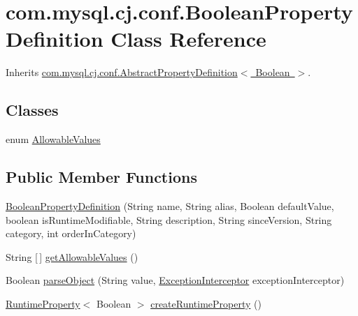 \hypertarget{classcom_1_1mysql_1_1cj_1_1conf_1_1_boolean_property_definition}{}\section{com.\+mysql.\+cj.\+conf.\+Boolean\+Property\+Definition Class Reference}
\label{classcom_1_1mysql_1_1cj_1_1conf_1_1_boolean_property_definition}


Inherits \mbox{\hyperlink{classcom_1_1mysql_1_1cj_1_1conf_1_1_abstract_property_definition}{com.\+mysql.\+cj.\+conf.\+Abstract\+Property\+Definition$<$ Boolean $>$}}.

\subsection*{Classes}
\begin{DoxyCompactItemize}
\item 
enum \mbox{\hyperlink{enumcom_1_1mysql_1_1cj_1_1conf_1_1_boolean_property_definition_1_1_allowable_values}{Allowable\+Values}}
\end{DoxyCompactItemize}
\subsection*{Public Member Functions}
\begin{DoxyCompactItemize}
\item 
\mbox{\hyperlink{classcom_1_1mysql_1_1cj_1_1conf_1_1_boolean_property_definition_ab76b95e077b6aaa03c831612b67e624d}{Boolean\+Property\+Definition}} (String name, String alias, Boolean default\+Value, boolean is\+Runtime\+Modifiable, String description, String since\+Version, String category, int order\+In\+Category)
\item 
String \mbox{[}$\,$\mbox{]} \mbox{\hyperlink{classcom_1_1mysql_1_1cj_1_1conf_1_1_boolean_property_definition_ad456fe5acb34798b759e12aad98cb0b9}{get\+Allowable\+Values}} ()
\item 
Boolean \mbox{\hyperlink{classcom_1_1mysql_1_1cj_1_1conf_1_1_boolean_property_definition_a8e046d48d44a9e26469191e21df2efdc}{parse\+Object}} (String value, \mbox{\hyperlink{interfacecom_1_1mysql_1_1cj_1_1exceptions_1_1_exception_interceptor}{Exception\+Interceptor}} exception\+Interceptor)
\item 
\mbox{\hyperlink{interfacecom_1_1mysql_1_1cj_1_1conf_1_1_runtime_property}{Runtime\+Property}}$<$ Boolean $>$ \mbox{\hyperlink{classcom_1_1mysql_1_1cj_1_1conf_1_1_boolean_property_definition_aeef0dd2eab9af91012ae5539eab40774}{create\+Runtime\+Property}} ()
\end{DoxyCompactItemize}


